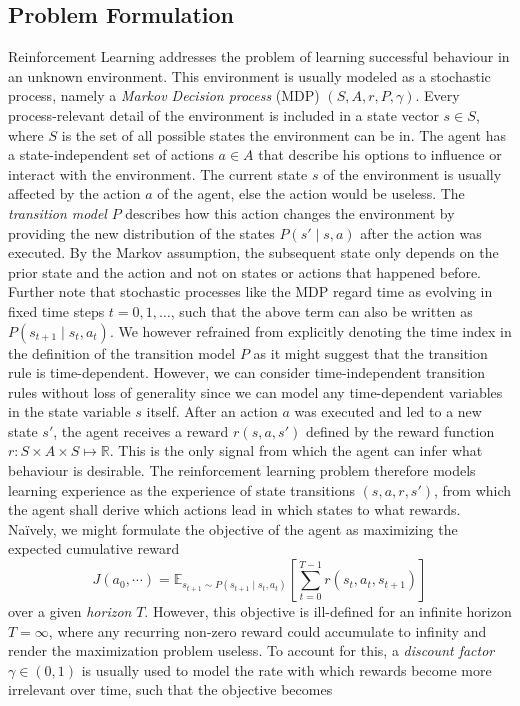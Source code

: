 \documentclass[a4paper, 11pt]{article}
\begin{document}
	\subsection{Problem Formulation}
	Reinforcement Learning addresses the problem of learning successful behaviour in an unknown environment. This environment is usually modeled as a stochastic process, namely a \textit{Markov Decision process} (MDP) $(S,A,r,P,\gamma)$. Every process-relevant detail of the environment is included in a state vector $s\in S$, where $S$ is the set of all possible states the environment can be in. The agent has a state-independent set of actions $a\in A$ that describe his options to influence or interact with the environment. The current state $s$ of the environment is usually affected by the action $a$ of the agent, else the action would be useless. 
	The \textit{transition model} $P$ describes how this action changes the environment by providing the new distribution of the states $P(s'\mid s,a)$ after the action was executed. By the Markov assumption, the subsequent state only depends on the prior state and the action and not on states or actions that happened before. Further note that stochastic processes like the MDP regard time as evolving in fixed time steps $t=0,1,\dots$, such that the above term can also be written as $P(s_{t+1}\mid s_t,a_t)$. We however refrained from explicitly denoting the time index in the definition of the transition model $P$ as it might suggest that the transition rule is time-dependent. However, we can consider time-independent transition rules without loss of generality since we can model any time-dependent variables in the state variable $s$ itself. 
	After an action $a$ was executed and led to a new state $s'$, the agent receives a reward $r(s,a,s')$ defined by the reward function $r:S\times A\times S \mapsto \mathbb{R}$. This is the only signal from which the agent can infer what behaviour is desirable. 
	The reinforcement learning problem therefore models learning experience as the experience of state transitions $(s,a,r,s')$, from which the agent shall derive which actions lead in which states to what rewards.
	Na\"ively, we might formulate the objective of the agent as maximizing the expected cumulative reward 
	\[J(a_0,\cdots)=\mathbb{E}_{s_{t+1}\sim P(s_{t+1}\mid s_t,a_t)}\left[\sum_{t=0}^{T-1}r(s_t,a_t,s_{t+1})\right]\]
	over a given \textit{horizon} $T$. However, this objective is ill-defined for an infinite horizon $T=\infty$, where any recurring non-zero reward could accumulate to infinity and render the maximization problem useless. To account for this, a \textit{discount factor} $\gamma\in(0,1)$ is usually used to model the rate with which rewards become more irrelevant over time, such that the objective becomes
\end{document}
